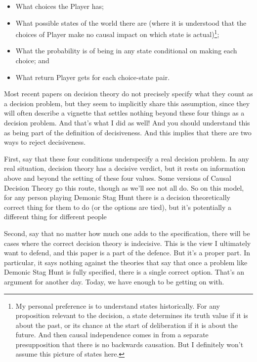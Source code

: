 \documentclass[
  12pt,
]{article}
\providecommand{\tightlist}{%
  \setlength{\itemsep}{0pt}\setlength{\parskip}{0pt}}
\begin{document}
\begin{itemize}
\tightlist
\item
  What choices the Player has;
\item
  What possible states of the world there are (where it is understood
  that the choices of Player make no causal impact on which state is
  actual)\footnote{My personal preference is to understand states
    historically. For any proposition relevant to the decision, a state
    determines its truth value if it is about the past, or its chance at
    the start of deliberation if it is about the future. And then causal
    independence comes in from a separate presupposition that there is
    no backwards causation. But I definitely won't assume this picture
    of states here.};
\item
  What the probability is of being in any state conditional on making
  each choice; and
\item
  What return Player gets for each choice-state pair.
\end{itemize}

Most recent papers on decision theory do not precisely specify what they
count as a decision problem, but they seem to implicitly share this
assumption, since they will often describe a vignette that settles
nothing beyond these four things as a decision problem. And that's what
I did as well! And you should understand this as being part of the
definition of decisiveness. And this implies that there are two ways to
reject decisiveness.

First, say that these four conditions underspecify a real decision
problem. In any real situation, decision theory has a decisive verdict,
but it rests on information above and beyond the setting of these four
values. Some versions of Causal Decision Theory go this route, though as
we'll see not all do. So on this model, for any person playing Demonic
Stag Hunt there is a decision theoretically correct thing for them to do
(or the options are tied), but it's potentially a different thing for
different people

Second, say that no matter how much one adds to the specification, there
will be cases where the correct decision theory is indecisive. This is
the view I ultimately want to defend, and this paper is a part of the
defence. But it's a proper part. In particular, it says nothing against
the theories that say that once a problem like Demonic Stag Hunt is
fully specified, there is a single correct option. That's an argument
for another day. Today, we have enough to be getting on with.
\end{document}
